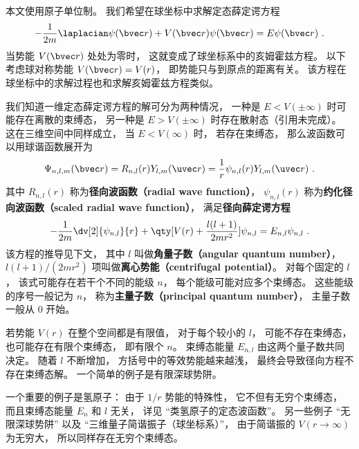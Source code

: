

本文使用原子单位制。 我们希望在球坐标中求解定态薛定谔方程
\begin{equation}\label{eq_RadSE_2}
-\frac{1}{2m}\laplacian \psi(\bvec r) + V(\bvec r)\psi(\bvec r) = E\psi(\bvec r)~.
\end{equation}
当势能 $V(\bvec r)$ 处处为零时， 这就变成了球坐标系中的亥姆霍兹方程。 以下考虑球对称势能 $V(\bvec r) = V(r)$， 即势能只与到原点的距离有关。 该方程在球坐标中的求解过程也和求解亥姆霍兹方程类似。

我们知道一维定态薛定谔方程的解可分为两种情况， 一种是 $E < V(\pm\infty)$ 时可能存在离散的束缚态， 另一种是 $E > V(\pm\infty)$ 时存在散射态（引用未完成）。 这在三维空间中同样成立， 当 $E < V(\infty)$ 时， 若存在束缚态， 那么波函数可以用球谐函数展开为
\begin{equation}\label{eq_RadSE_4}
\Psi_{n, l,m}(\bvec r) = R_{n, l}(r) Y_{l,m}(\uvec r) = \frac{1}{r}\psi_{n, l}(r) Y_{l,m}(\uvec r)~.
\end{equation}
其中 $R_{n, l}(r)$ 称为\textbf{径向波函数（radial wave function）}， $\psi_{n, l}(r)$ 称为\textbf{约化径向波函数（scaled radial wave function）}， 满足\textbf{径向薛定谔方程}
\begin{equation}\label{eq_RadSE_1}
-\frac{1}{2m} \dv[2]{\psi_{n, l}}{r} + \qty[V(r) + \frac{l(l + 1)}{2mr^2}]\psi_{n, l} = E_{n, l} \psi_{n, l}~.
\end{equation}
该方程的推导见下文， 其中 $l$ 叫做\textbf{角量子数（angular quantum number）}， $l(l + 1)/(2mr^2)$ 项叫做\textbf{离心势能（centrifugal potential）}。 对每个固定的 $l$， 该式可能存在若干个不同的能级 $n$， 每个能级可能对应多个束缚态。 这些能级的序号一般记为 $n$， 称为\textbf{主量子数（principal quantum number）}， 主量子数一般从 0 开始。

若势能 $V(r)$ 在整个空间都是有限值， 对于每个较小的 $l$， 可能不存在束缚态， 也可能存在有限个束缚态， 即有限个 $n$。 束缚态能量 $E_{n,l}$ 由这两个量子数共同决定。 随着 $l$ 不断增加， 方括号中的等效势能越来越浅， 最终会导致径向方程不存在束缚态解。 一个简单的例子是有限深球势阱。

一个重要的例子是氢原子： 由于 $1/r$ 势能的特殊性， 它不但有无穷个束缚态， 而且束缚态能量 $E_n$ 和 $l$ 无关， 详见 “类氢原子的定态波函数”。 另一些例子 “无限深球势阱” 以及 “三维量子简谐振子（球坐标系）”， 由于简谐振的 $V(r\to \infty)$ 为无穷大， 所以同样存在无穷个束缚态。

